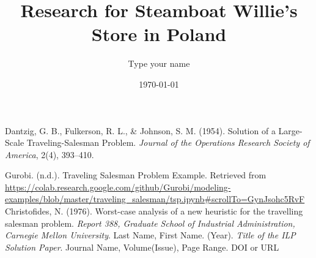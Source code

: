 \documentclass{report}
\title{Research for Steamboat Willie's Store in Poland}
\author{Type your name} %
\date{\today}
\begin{document}
\maketitle 
 \tableofcontents
 \listoffigures
\newpage








\begin{thebibliography}{9}
 Dantzig, G. B., Fulkerson, R. L., \& Johnson, S. M. (1954). Solution of a Large-Scale Traveling-Salesman Problem. \textit{Journal of the Operations Research Society of America}, 2(4), 393–410.

 Gurobi. (n.d.). Traveling Salesman Problem Example. Retrieved from \url{https://colab.research.google.com/github/Gurobi/modeling-examples/blob/master/traveling_salesman/tsp.ipynb#scrollTo=GynJsohc5RvF}
 Christofides, N. (1976). Worst-case analysis of a new heuristic for the travelling salesman problem. \emph{Report 388, Graduate School of Industrial Administration, Carnegie Mellon University}.
 Last Name, First Name. (Year). \emph{Title of the ILP Solution Paper}. Journal Name, Volume(Issue), Page Range. DOI or URL
\end{thebibliography}

% 
% 
\end{document}
